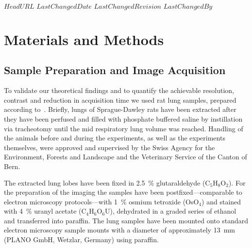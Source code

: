 \svnidlong
{$HeadURL$}
{$LastChangedDate$}
{$LastChangedRevision$}
{$LastChangedBy$}

\ifhtml
\else
\begin{center}
\end{center}
\fi

\section{Materials and Methods}%
\label{sec:materials and methods}%
\subsection{Sample Preparation and Image Acquisition}%
To validate our theoretical findings and to quantify the achievable resolution, contrast and reduction in acquisition time we used rat lung samples, prepared according  to~\cite{Schittny1998}. Briefly, lungs of Sprague-Dawley rats have been extracted after they have been perfused and filled with phosphate buffered saline by instillation via tracheotomy until the mid respiratory lung volume was reached. Handling of the animals before and during the experiments, as well as the experiments themselves, were approved and supervised by the Swiss Agency for the Environment, Forests and Landscape and the Veterinary Service of the Canton of Bern.

The extracted lung lobes have been fixed in \SI{2.5}{\percent} glutaraldehyde (C$_5$H$_8$O$_2$). For the preparation of the imaging the samples have been postfixed---comparable to electron microscopy protocols---with \SI{1}{\percent} osmium tetroxide (OsO$_4$) and stained with \SI{4}{\percent} uranyl acetate (C$_4$H$_6$O$_6$U), dehydrated in a graded series of ethanol and transferred into paraffin. The lung samples have been mounted onto standard electron microscopy sample mounts with a diameter of approximately \SI{13}{\milli\meter} (PLANO GmbH, Wetzlar, Germany) using paraffin.


